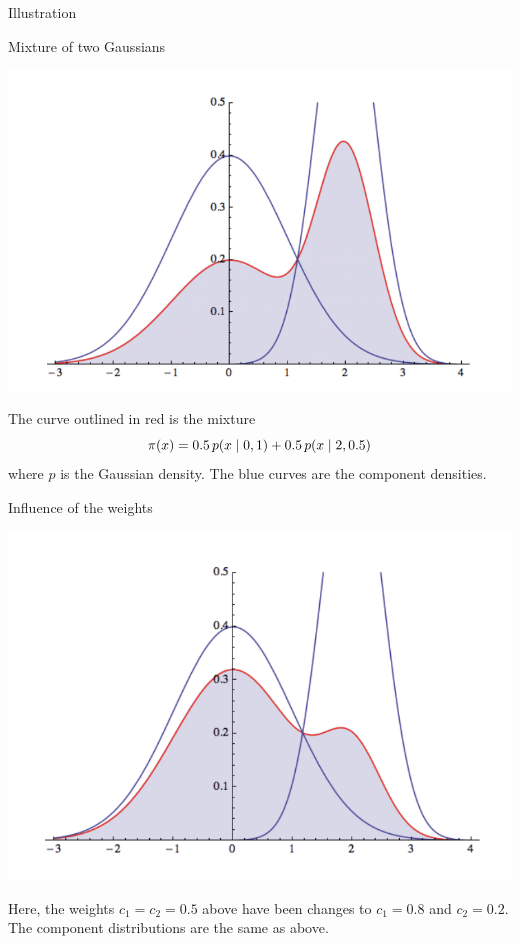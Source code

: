 \documentclass[10pt]{beamer}
\begin{document}
\begin{frame}{Illustration}
\begin{sblock}{Mixture of two Gaussians}
\begin{minipage}{0.4\textwidth}
\includegraphics[width=\textwidth]{images/gmm_weights_1}
\end{minipage} 
\hfill 
\begin{minipage}{0.5\textwidth}
The curve outlined in red is the mixture
\[ \pi(x) = 0.5 \, p(x \; | \; 0, 1) + 0.5 \, p(x \; | \; 2, 0.5) \]
where $p$ is the Gaussian density.  The blue curves are the component densities.
\end{minipage} 

\end{sblock}
\vfill

\begin{sblock}{Influence of the weights}
\begin{minipage}{0.4\textwidth}
\includegraphics[width=\textwidth]{images/gmm_weights_2}
\end{minipage} 
\hfill 
\begin{minipage}{0.5\textwidth}
Here, the weights $c_1=c_2 =0.5$ above have been changes to $c_1 = 0.8$ and $c_2 = 0.2$.  The component distributions are the same as above. 
\end{minipage} 

\end{sblock}
\end{frame}
\end{document}
